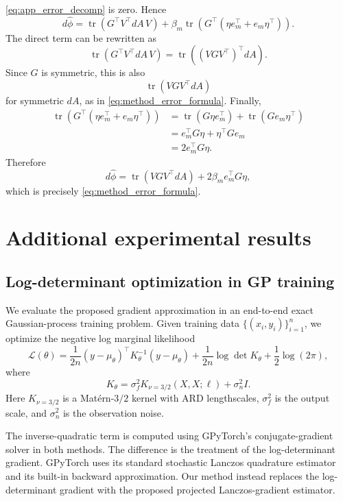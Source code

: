 \documentclass{article}
\begin{document}
\eqref{eq:app_error_decomp} is zero. Hence
\[
    d\widehat{\phi}
    =
    \operatorname{tr}(G^\top V^\top dA\,V)
    +
    \beta_m
    \operatorname{tr}\!\left(
        G^\top(\eta e_m^\top+e_m\eta^\top)
    \right).
\]
The direct term can be rewritten as
\[
    \operatorname{tr}(G^\top V^\top dA\,V)
    =
    \operatorname{tr}\!\left((VGV^\top)^\top dA\right).
\]
Since \(G\) is symmetric, this is also
\[
    \operatorname{tr}\!\left(VGV^\top dA\right)
\]
for symmetric \(dA\), as in \eqref{eq:method_error_formula}. Finally,
\begin{align}
    \operatorname{tr}\!\left(
        G^\top(\eta e_m^\top+e_m\eta^\top)
    \right)
    &=
    \operatorname{tr}(G\eta e_m^\top)
    +
    \operatorname{tr}(G e_m\eta^\top) \\
    &=
    e_m^\top G\eta+\eta^\top G e_m \\
    &=
    2e_m^\top G\eta .
\end{align}
Therefore
\begin{equation}
    d\widehat{\phi}
    =
    \operatorname{tr}\!\left(VGV^\top dA\right)
    +
    2\beta_m e_m^\top G\eta ,
    \label{eq:app_method_error_formula}
\end{equation}
which is precisely \eqref{eq:method_error_formula}. 

\section{Additional experimental results}
\label{app:Extra_exp_results}
\subsection{Log-determinant optimization in GP training}
\label{app:Gpy_logdet}
We evaluate the proposed gradient approximation in an end-to-end exact
Gaussian-process training problem. Given training data
\(\{(x_i,y_i)\}_{i=1}^{n}\), we optimize the negative log marginal likelihood
\[
    \mathcal{L}(\theta)
    =
    \frac{1}{2n}(y-\mu_\theta)^\top K_\theta^{-1}(y-\mu_\theta)
    +
    \frac{1}{2n}\log\det K_\theta
    +
    \frac{1}{2}\log(2\pi),
\]
where
\[
    K_\theta
    =
    \sigma_f^2 K_{\nu=3/2}(X,X;\ell)
    +
    \sigma_n^2 I.
\]
Here \(K_{\nu=3/2}\) is a Mat\'ern-\(3/2\) kernel with ARD lengthscales,
\(\sigma_f^2\) is the output scale, and \(\sigma_n^2\) is the observation noise.

The inverse-quadratic term is computed using GPyTorch's conjugate-gradient
solver in both methods. The difference is the treatment of the log-determinant
gradient. GPyTorch uses its standard stochastic Lanczos quadrature estimator and
its built-in backward approximation. Our method instead replaces the
log-determinant gradient with the proposed projected Lanczos-gradient estimator.
\end{document}
